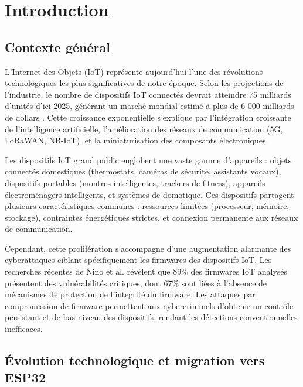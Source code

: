 
\chapter{Introduction}
\label{chap:introduction}

\section{Contexte général}

L'Internet des Objets (\ac{IoT}) représente aujourd'hui l'une des révolutions technologiques les plus significatives de notre époque. Selon les projections de l'industrie, le nombre de dispositifs \ac{IoT} connectés devrait atteindre 75 milliards d'unités d'ici 2025, générant un marché mondial estimé à plus de 6 000 milliards de dollars \cite{Statista2024IoTMarket}. Cette croissance exponentielle s'explique par l'intégration croissante de l'intelligence artificielle, l'amélioration des réseaux de communication (5G, LoRaWAN, NB-IoT), et la miniaturisation des composants électroniques.

Les dispositifs \ac{IoT} grand public englobent une vaste gamme d'appareils : objets connectés domestiques (thermostats, caméras de sécurité, assistants vocaux), dispositifs portables (montres intelligentes, trackers de fitness), appareils électroménagers intelligents, et systèmes de domotique. Ces dispositifs partagent plusieurs caractéristiques communes : ressources limitées (processeur, mémoire, stockage), contraintes énergétiques strictes, et connexion permanente aux réseaux de communication.

Cependant, cette prolifération s'accompagne d'une augmentation alarmante des cyberattaques ciblant spécifiquement les firmwares des dispositifs \ac{IoT}. Les recherches récentes de Nino et al. \cite{Nino2024UnveilingIoT} révèlent que 89\% des firmwares \ac{IoT} analysés présentent des vulnérabilités critiques, dont 67\% sont liées à l'absence de mécanismes de protection de l'intégrité du firmware. Les attaques par compromission de firmware permettent aux cybercriminels d'obtenir un contrôle persistant et de bas niveau des dispositifs, rendant les détections conventionnelles inefficaces.

\section{Évolution technologique et migration vers ESP32}

